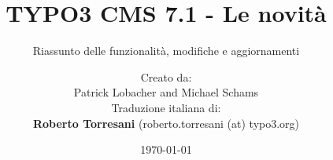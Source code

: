 %

%
%

\documentclass[t]{beamer}

\beamertemplatenavigationsymbolsempty

{
	\usetheme{typo3slides}
}

\title{TYPO3 CMS 7.1 - Le novità}
\subtitle{Riassunto delle funzionalità, modifiche e aggiornamenti}
\author{
	\centerline{Creato da:}
	\centerline{Patrick Lobacher and Michael Schams}
	\vspace{0.4cm}
	\centerline{Traduzione italiana di:}
	\textbf{Roberto Torresani} (roberto.torresani (at) typo3.org)
}

\date{\today}



\sharefont


\begingroup
	[default]
	\begin{frame}
		\titlepage
	\end{frame}
\endgroup


\section*{TYPO3 CMS 7.1 - Le novità}
\begin{frame}[fragile]
	\frametitle{Indice delle sezioni}
	\framesubtitle{Indice delle sezioni}

	\begin{multicols}{2}
		\tableofcontents
	\end{multicols}

\end{frame}

